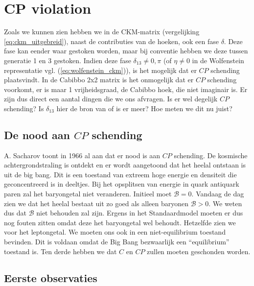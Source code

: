 \documentclass[../main.tex]{subfiles}
\begin{document}
\section{CP violation}%
\label{sec:cp_violation}

Zoals we kunnen zien hebben we in de CKM-matrix (vergelijking \ref{eq:ckm_uitgebreid}), naast de contributies van de hoeken, ook een fase $\delta$. Deze fase kan eender waar gestoken worden, maar bij conventie hebben we deze tussen generatie 1 en 3 gestoken. Indien deze fase $\delta_{13}\neq 0,\pi$ (of $\eta\neq 0$ in de Wolfenstein representatie vgl. (\ref{eq:wolfenstein_ckm})), is het mogelijk dat er $CP$ schending plaatsvindt. In de Cabibbo 2x2 matrix is het onmogelijk dat er $CP$ schending voorkomt, er is maar 1 vrijheidsgraad, de Cabibbo hoek, die niet imaginair is. Er zijn dus direct een aantal dingen die we ons afvragen. Is er wel degelijk $CP$ schending? Is $\delta_{13}$ hier de bron van of is er meer? Hoe meten we dit nu juist?

\subsection{De nood aan $CP$ schending}%
\label{sub:de_nood_voor_cp_schending}

A. Sacharov toont in 1966 al aan dat er nood is aan $CP$ schending. De kosmische achtergrondstraling is ontdekt en er wordt aangetoond dat het heelal ontstaan is uit de big bang. Dit is een toestand van extreem hoge energie en densiteit die geconcentreerd is in deeltjes. Bij het opsplitsen van energie in quark antiquark paren zal het baryongetal niet veranderen. Initieel moet $\mathcal{B}=0$. Vandaag de dag zien we dat het heelal bestaat uit zo goed als alleen baryonen $\mathcal{B}>0$. We weten dus dat $\mathcal{B}$ niet behouden zal zijn. Ergens in het Standaardmodel moeten er dus nog fouten zitten omdat deze het baryongetal wel behoudt. Hetzelfde zien we voor het leptongetal. We moeten ons ook in een niet-equilibrium toestand bevinden. Dit is voldaan omdat de Big Bang bezwaarlijk een ``equilibrium'' toestand is. Ten derde hebben we dat $C$ en $CP$ zullen moeten geschonden worden.

\subsection{Eerste observaties}%
\label{sub:eerste_observaties}
\end{document}
